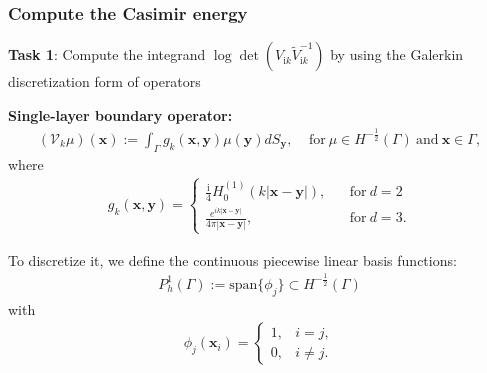 \documentclass[dvipsnames,10pt]{beamer}
\begin{document}
\begin{frame}
    \frametitle{Compute the Casimir energy}
    \vspace{0.3cm}
\textbf{Task 1}: Compute the integrand $\log\det\left(V_{\mathrm{i}k}\tilde{V}_{\mathrm{i}k}^{-1}\right)$ by using the Galerkin discretization form of operators
\vspace{0.2cm}

\textbf{Single-layer boundary operator:}
\begin{align*}
    (\mathcal{V}_{k}\mu)(\boldsymbol{x}) := \int_{\Gamma}g_{k}(\boldsymbol{x},\boldsymbol{y})\mu(\boldsymbol{y})dS_{\boldsymbol{y}}, \ \ \ \ \ 
    \text{for}\ \mu\in H^{-\frac{1}{2}}(\Gamma) \  \text{and} \ \boldsymbol{x}\in\Gamma,
\end{align*}
where \begin{align*}
    g_{k}(\boldsymbol{x},\boldsymbol{y}) = \begin{cases}
          \frac{\mathrm{i}}{4}H_{0}^{(1)}(k|\boldsymbol{x}-\boldsymbol{y}|), \ \ \ \ &\text{for} \ d = 2\\
          \frac{e^{ik|\boldsymbol{x}-\boldsymbol{y}|}}{4\pi|\boldsymbol{x} - \boldsymbol{y}|}, \ \ \ \ &\text{for} \ d = 3.
        \end{cases}
\end{align*}
\vspace{0.2cm}

To discretize it, we define the continuous piecewise linear basis functions:
\begin{align*}
    P_{h}^{1}(\Gamma) := \text{span}\{\phi_{j}\} \subset H^{-\frac{1}{2}}(\Gamma)
\end{align*}
with 
\begin{align*}
    \phi_{j}(\boldsymbol{x}_{i}) = \begin{cases}
        1, & i = j,\\
        0, & i\neq j.
    \end{cases}
\end{align*}

\end{frame}
\end{document}
